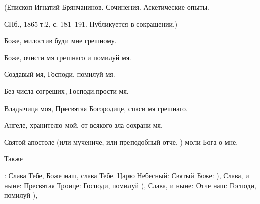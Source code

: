 {{{{\bigskip

(Епископ Игнатий Брянчанинов. Сочинения. Аскетические опыты.

СПб., 1865 т.2, с. 181--191. Публикуется в сокращении.)

 


\mychapterending

 









Боже, милостив буди мне грешному. 

Боже, очисти мя грешнаго и помилуй мя. 




Создавый мя, Господи, помилуй мя. 




Без числа согреших, Господи,прости мя. 




Владычица моя, Пресвятая Богородице, спаси мя грешнаго. 




Ангеле, хранителю мой, от всякого зла сохрани мя. 




Святой апостоле (или мучениче, или преподобный отче,  ) моли Бога о мне. 







\bfseries 


Также}: \MolitvamiSviatyhOtecNashih Слава Тебе, Боже наш, слава Тебе. Царю Небесный: Святый Боже: ), Слава, и ныне: Пресвятая Троице: Господи, помилуй ), Слава, и ныне: Отче наш: Господи, помилуй ), 





}}}
